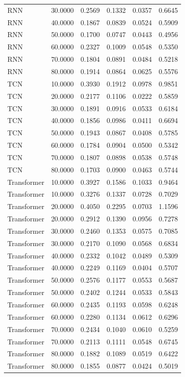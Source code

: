 \begin{tabular}{lrrrrr}
RNN & 30.0000 & 0.2569 & 0.1332 & 0.0357 & 0.6645 \\
RNN & 40.0000 & 0.1867 & 0.0839 & 0.0524 & 0.5909 \\
RNN & 50.0000 & 0.1700 & 0.0747 & 0.0443 & 0.4956 \\
RNN & 60.0000 & 0.2327 & 0.1009 & 0.0548 & 0.5350 \\
RNN & 70.0000 & 0.1804 & 0.0891 & 0.0484 & 0.5218 \\
RNN & 80.0000 & 0.1914 & 0.0864 & 0.0625 & 0.5576 \\
TCN & 10.0000 & 0.3930 & 0.1912 & 0.0978 & 0.9851 \\
TCN & 20.0000 & 0.2177 & 0.1106 & 0.0222 & 0.5859 \\
TCN & 30.0000 & 0.1891 & 0.0916 & 0.0533 & 0.6184 \\
TCN & 40.0000 & 0.1856 & 0.0986 & 0.0411 & 0.6694 \\
TCN & 50.0000 & 0.1943 & 0.0867 & 0.0408 & 0.5785 \\
TCN & 60.0000 & 0.1784 & 0.0904 & 0.0500 & 0.5342 \\
TCN & 70.0000 & 0.1807 & 0.0898 & 0.0538 & 0.5748 \\
TCN & 80.0000 & 0.1703 & 0.0900 & 0.0463 & 0.5744 \\
Transformer & 10.0000 & 0.3927 & 0.1586 & 0.1033 & 0.9464 \\
Transformer & 10.0000 & 0.3276 & 0.1337 & 0.0728 & 0.7029 \\
Transformer & 20.0000 & 0.4050 & 0.2295 & 0.0703 & 1.1596 \\
Transformer & 20.0000 & 0.2912 & 0.1390 & 0.0956 & 0.7278 \\
Transformer & 30.0000 & 0.2460 & 0.1353 & 0.0575 & 0.7085 \\
Transformer & 30.0000 & 0.2170 & 0.1090 & 0.0568 & 0.6834 \\
Transformer & 40.0000 & 0.2332 & 0.1042 & 0.0489 & 0.5309 \\
Transformer & 40.0000 & 0.2249 & 0.1169 & 0.0404 & 0.5707 \\
Transformer & 50.0000 & 0.2576 & 0.1177 & 0.0553 & 0.5687 \\
Transformer & 50.0000 & 0.2402 & 0.1244 & 0.0533 & 0.5843 \\
Transformer & 60.0000 & 0.2435 & 0.1193 & 0.0598 & 0.6248 \\
Transformer & 60.0000 & 0.2280 & 0.1134 & 0.0612 & 0.6296 \\
Transformer & 70.0000 & 0.2434 & 0.1040 & 0.0610 & 0.5259 \\
Transformer & 70.0000 & 0.2113 & 0.1111 & 0.0548 & 0.6745 \\
Transformer & 80.0000 & 0.1882 & 0.1089 & 0.0519 & 0.6422 \\
Transformer & 80.0000 & 0.1855 & 0.0877 & 0.0424 & 0.5019 \\
\bottomrule
\end{tabular}
